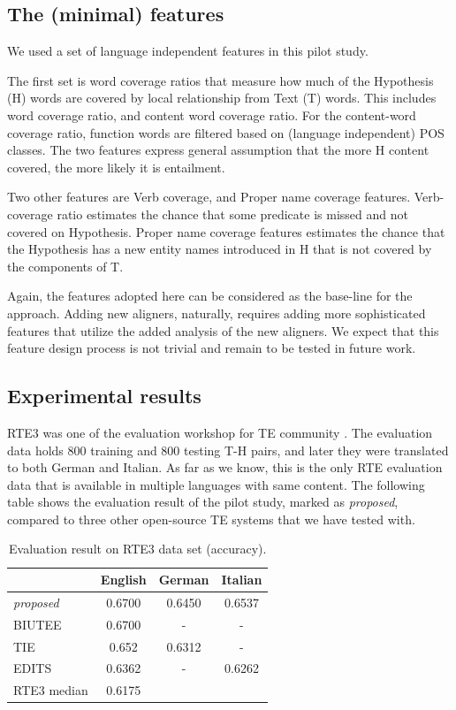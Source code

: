 \documentclass[11pt,letterpaper]{article}
\begin{document}
\subsection{The (minimal) features} 
We used a set of language independent features in this pilot study. 

The first set is word coverage ratios that measure how much of the
Hypothesis (H) words are covered by local relationship from Text (T)
words. This includes word coverage ratio, and content word coverage
ratio. For the content-word coverage ratio, function words are
filtered based on (language independent) POS classes. The two features 
express general assumption that the more H content covered, the more
likely it is entailment. 

Two other features are Verb coverage, and Proper name coverage
features. Verb-coverage ratio estimates the chance that some
predicate is missed and not covered on Hypothesis. 
Proper name coverage features estimates the chance that the Hypothesis
has a new entity names introduced in H that is not covered by the
components of T. 

Again, the features adopted here can be considered as the base-line
for the approach. Adding new aligners, naturally, requires adding more 
sophisticated features that utilize the added analysis of the new
aligners. We expect that this feature design process is not trivial
and remain to be tested in future work.  

\subsection{Experimental results} 
RTE3 was one of the evaluation workshop for TE community \cite{}. The
evaluation data holds 800 training and 800 testing T-H pairs, and 
later they were translated to both German and Italian. As far as we
know, this is the only RTE evaluation data that is available in
multiple languages with same content. The following table shows the
evaluation result  of the pilot study, marked as {\em proposed},
compared to three other  open-source TE systems that we have tested
with. 

\begin{table}[t!]
\centering
\small
\begin{tabular}{l|ccc}
          &   English   &   German   &   Italian \\
\hline
{\em proposed}&   0.6700      &   0.6450    &  0.6537  \\
BIUTEE        &   0.6700      &     -       &     -    \\
TIE           &   0.652       &   0.6312    &     -    \\ 
EDITS         &   0.6362      &     -       &  0.6262  \\
RTE3 median   &   0.6175      &             &          \\

\end{tabular}
\caption{Evaluation result on RTE3 data set (accuracy).}
\label{table:rte3}
\end{table}
\end{document}
